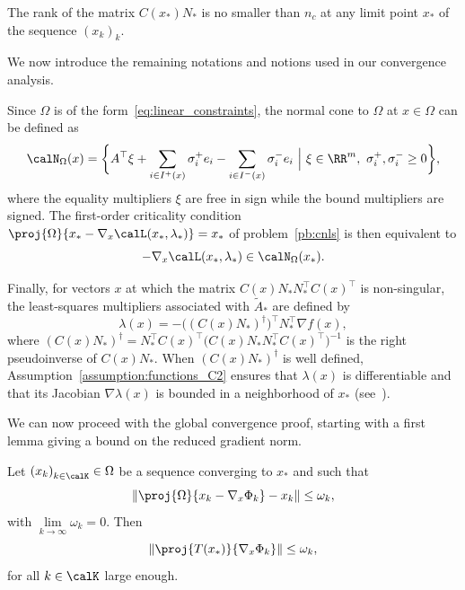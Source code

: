 \begin{assumption}\label{assumption:cq_null_space_jacobian}
	The rank of the matrix $C(x_*)N_*$ is no smaller than $n_c$ at any limit point $x_*$ of the sequence $(x_k)_k$.
\end{assumption}

We now introduce the remaining notations and notions used in our convergence analysis.

Since $\Omega$ is of the form~\eqref{eq:linear_constraints}, the normal cone to $\Omega$ at $x \in \Omega$ can be defined as
\begin{equation}\label{eq:normal_cone}
	\calN_\Omega(x) = \bigg\{ A^\top\xi + \sum_{i \in I^+(x)} \sigma^+_i e_i - \sum_{i \in I^-(x)} \sigma^-_i e_i \ \Big|\ \xi\in\RR^m,\ \sigma^+_i, \sigma^-_i\ge0\bigg\},
\end{equation}
where the equality multipliers $\xi$ are free in sign while the bound multipliers are signed. The first-order criticality condition $\proj{\Omega}{x_*-\nabla_x\calL(x_*,\lambda_*)}=x_*$ of problem~\eqref{pb:cnls} is then equivalent to
\[-\nabla_x\calL(x_*,\lambda_*)\in \calN_\Omega(x_*).\]

Finally, for vectors $x$ at which the matrix $C(x)N_* N_*^\top C(x)^\top$ is non-singular, the least-squares multipliers associated with $\tilde A_*$ are defined by
\begin{equation*}
	\lambda(x) = -\big((C(x)N_*)^\dagger\big)^\top N_*^\top\nabla f(x),
\end{equation*}
where $(C(x)N_*)^\dagger = N_*^\top C(x)^\top\big(C(x)N_* N_*^\top C(x)^\top\big)^{-1}$ is the right pseudoinverse of $C(x)N_*$. When $(C(x)N_*)^\dagger $ is well defined, Assumption~\ref{assumption:functions_C2} ensures that $\lambda(x)$ is differentiable and that its Jacobian $\nabla\lambda(x)$ is bounded in a neighborhood of $x_*$ (see~\cite[Lemma 2.1]{conn-etal:1996b}).

We can now proceed with the global convergence proof, starting with a first lemma giving a bound on the reduced gradient norm.
\begin{lemma}\label{lemma:bound_proj_algrad_sol_nullspace}
	Let $\left(x_k\right)_{k\in \calK} \in \Omega$ be a sequence converging to $x_*$ and such that
	\[\left\| \proj{\Omega}{x_k - \nabla_x \Phi_k}-x_k \right\| \le \omega_k,\]
	with $\lim\limits_{k\to \infty} \omega_k = 0$. Then
	\begin{equation*}
		\left\| \proj{T(x_*)}{\nabla_x \Phi_k} \right\| \le  \omega_k,
	\end{equation*}
	for all $k\in \calK$ large enough.
\end{lemma}

